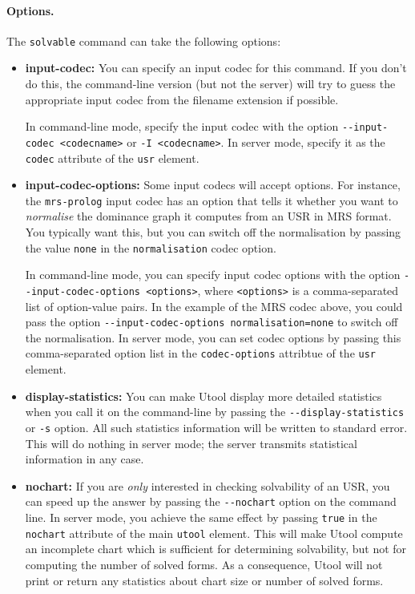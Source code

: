 \paragraph{Options.}
The \verb?solvable? command can take the following options:
\begin{itemize}
\item \textbf{input-codec:} You can specify an input codec for this
command. If you don't do this, the command-line version (but not the
server) will try to guess the appropriate input codec from the
filename extension if possible.

In command-line mode, specify the input codec with the option
\verb?--input-codec <codecname>? or \verb?-I <codecname>?. In server
mode, specify it as the \verb?codec? attribute of the \verb?usr?
element.

\item \textbf{input-codec-options:} Some input codecs will accept options. For instance, the \verb?mrs-prolog? input codec has an option that tells it whether you want to \emph{normalise} the dominance graph it computes from an USR in MRS format. You typically want this, but you can switch off the normalisation by passing the value \verb?none? in the \verb?normalisation? codec option.

In command-line mode, you can specify input codec options with the option \verb?--input-codec-options <options>?, where \verb?<options>? is a comma-separated list of option-value pairs. In the example of the MRS codec above, you could pass the option \verb?--input-codec-options normalisation=none? to switch off the normalisation. In server mode, you can set codec options by passing this comma-separated option list in the \verb?codec-options? attribtue of the \verb?usr? element.

\item \textbf{display-statistics:} You can make Utool display more detailed
statistics when you call it on the command-line by passing the
\verb?--display-statistics? or \verb?-s? option. All such statistics
information will be written to standard error. This will do nothing in server mode; the server transmits statistical information in any case.

\item \textbf{nochart:} If you are \emph{only} interested in checking solvability of an USR, you can speed up the answer by passing the \verb?--nochart? option on the command line. In server mode, you achieve the same effect by passing \verb?true? in the \verb?nochart? attribute of the main \verb?utool? element. This will make Utool compute an incomplete chart which is sufficient for determining solvability, but not for computing the number of solved forms. As a consequence, Utool will not print or return any statistics about chart size or number of solved forms.
\end{itemize}




